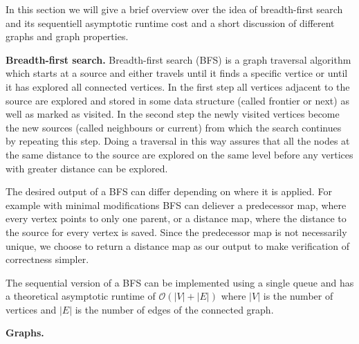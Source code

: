 \documentclass[letterpaper]{article}
\newcommand{\mypar}[1]{{\bf #1.}}
\begin{document}
In this section we will give a brief overview over the idea of breadth-first search and its sequentiell asymptotic runtime cost and a short discussion of different graphs and graph properties. 


\mypar{Breadth-first search}
Breadth-first search (BFS) is a graph traversal algorithm which starts at a source and either travels until it finds a specific vertice or until it has explored all connected vertices. In the first step all vertices adjacent to the source are explored and stored in some data structure (called frontier or next) as well as marked as visited. In the second step the newly visited vertices become the new sources (called neighbours or current) from which the search continues by repeating this step. Doing a traversal in this way assures that all the nodes at the same distance to the source are explored on the same level before any vertices with greater distance can be explored. 

The desired output of a BFS can differ depending on where it is applied. For example with minimal modifications BFS can deliever a predecessor map, where every vertex points to only one parent, or a distance map, where the distance to the source for every vertex is saved. Since the predecessor map is not necessarily unique, we choose to return a distance map as our output to make verification of correctness simpler.  

The sequential version of a BFS can be implemented using a single queue and has a theoretical asymptotic runtime of $\mathcal{O}(\lvert V\rvert + \lvert E\rvert)$ where $\lvert V\rvert$ is the number of vertices and $\lvert E\rvert$ is the number of edges of the connected graph.


\mypar{Graphs}



\end{document}
